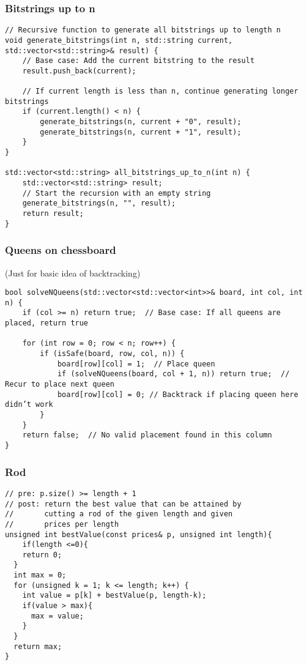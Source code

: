 \subsubsection{Bitstrings up to n}
\begin{lstlisting}[style = codeexpert]
// Recursive function to generate all bitstrings up to length n
void generate_bitstrings(int n, std::string current, std::vector<std::string>& result) {
    // Base case: Add the current bitstring to the result
    result.push_back(current);

    // If current length is less than n, continue generating longer bitstrings
    if (current.length() < n) {
        generate_bitstrings(n, current + "0", result);
        generate_bitstrings(n, current + "1", result);
    }
}

std::vector<std::string> all_bitstrings_up_to_n(int n) {
    std::vector<std::string> result;
    // Start the recursion with an empty string
    generate_bitstrings(n, "", result);
    return result;
}
\end{lstlisting}

\subsubsection{Queens on chessboard}
(Just for basic idea of backtracking)

\begin{lstlisting}[style = codeexpert]
bool solveNQueens(std::vector<std::vector<int>>& board, int col, int n) {
    if (col >= n) return true;  // Base case: If all queens are placed, return true

    for (int row = 0; row < n; row++) {
        if (isSafe(board, row, col, n)) {
            board[row][col] = 1;  // Place queen
            if (solveNQueens(board, col + 1, n)) return true;  // Recur to place next queen
            board[row][col] = 0; // Backtrack if placing queen here didn’t work
        }
    }
    return false;  // No valid placement found in this column
}

\end{lstlisting}

\subsubsection{Rod}
\begin{lstlisting}[style = codeexpert]
// pre: p.size() >= length + 1
// post: return the best value that can be attained by
//       cutting a rod of the given length and given
//       prices per length
unsigned int bestValue(const prices& p, unsigned int length){
    if(length <=0){
    return 0;
  }
  int max = 0;
  for (unsigned k = 1; k <= length; k++) {
    int value = p[k] + bestValue(p, length-k);
    if(value > max){
      max = value;
    }
  }
  return max;
}

\end{lstlisting}
\columnbreak
